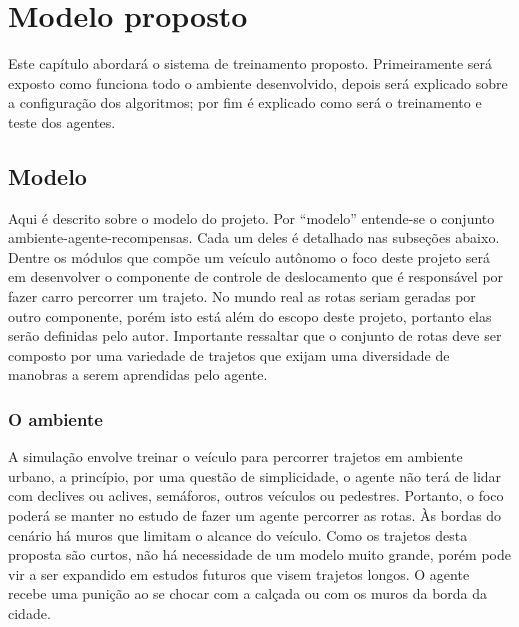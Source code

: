 \chapter{Modelo proposto}\label{cap:proposta}
Este capítulo abordará o sistema de treinamento proposto. Primeiramente será exposto como funciona todo o ambiente desenvolvido, depois será explicado sobre a configuração dos algoritmos; por fim é explicado como será o treinamento e teste dos agentes. 

\section{Modelo}\label{modelo}
Aqui é descrito sobre o modelo do projeto. Por ``modelo'' entende-se o conjunto ambiente-agente-recompensas. Cada um deles é detalhado nas subseções abaixo. Dentre os módulos que compõe um veículo autônomo o foco deste projeto será em desenvolver o componente de controle de deslocamento que é responsável por fazer carro percorrer um trajeto. No mundo real as rotas seriam geradas por outro componente, porém isto está além do escopo deste projeto, portanto elas serão definidas pelo autor. Importante ressaltar que o conjunto de rotas deve ser composto por uma variedade de trajetos que exijam uma diversidade de manobras a serem aprendidas pelo agente.

\subsection{O ambiente}
A simulação envolve treinar o veículo para percorrer trajetos em ambiente urbano, a princípio, por uma questão de simplicidade, o agente não terá de lidar com declives ou aclives, semáforos, outros veículos ou pedestres. Portanto, o foco poderá se manter no estudo de fazer um agente percorrer as rotas. Às bordas do cenário há muros que limitam o alcance do veículo. Como os trajetos desta proposta são curtos, não há necessidade de um modelo muito grande, porém pode vir a ser expandido em estudos futuros que visem trajetos longos. O agente recebe uma punição ao se chocar com a calçada ou com os muros da borda da cidade.

